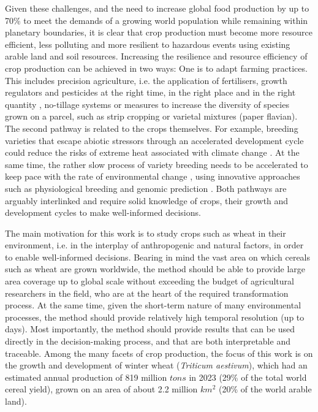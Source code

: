 Given these challenges, and the need to increase global food production by up to 70\% to meet the demands of a growing world population \citep{hertel_global_2011} while remaining within planetary boundaries, it is clear that crop production must become more resource efficient, less polluting and more resilient to hazardous events using existing arable land and soil resources. Increasing the resilience and resource efficiency of crop production can be achieved in two ways: One is to adapt farming practices. This includes precision agriculture, i.e. the application of fertilisers, growth regulators and pesticides at the right time, in the right place and in the right quantity \citep{finger_precision_2019}, no-tillage systems \citep{triplett_notillage_2008} or measures to increase the diversity of species grown on a parcel, such as strip cropping \citep{juventia_spatio-temporal_2022} or varietal mixtures (paper flavian). The second pathway is related to the crops themselves. For example, breeding varieties that escape abiotic stressors through an accelerated development cycle could reduce the risks of extreme heat associated with climate change \citep{rezaei_climate_2018, rogger_can_2021}. At the same time, the rather slow process of variety breeding needs to be accelerated to keep pace with the rate of environmental change \citep{zhang_climate_2022}, using innovative approaches such as physiological breeding \citep{reynolds_physiological_2016} and genomic prediction \citep{desta_genomic_2014}. Both pathways are arguably interlinked and require solid knowledge of crops, their growth and development cycles to make well-informed decisions.

The main motivation for this work is to study crops such as wheat in their environment, i.e. in the interplay of anthropogenic and natural factors, in order to enable well-informed decisions. Bearing in mind the vast area on which cereals such as wheat are grown worldwide, the method should be able to provide large area coverage up to global scale without exceeding the budget of agricultural researchers in the field, who are at the heart of the required transformation process. At the same time, given the short-term nature of many environmental processes, the method should provide relatively high temporal resolution (up to days). Most importantly, the method should provide results that can be used directly in the decision-making process, and that are both interpretable and traceable. Among the many facets of crop production, the focus of this work is on the growth and development of winter wheat (\textsl{Triticum aestivum}), which had an estimated annual production of 819 million $tons$ in 2023 (29\% of the total world cereal yield), grown on an area of about 2.2 million $km^2$ (20\% of the world arable land).

